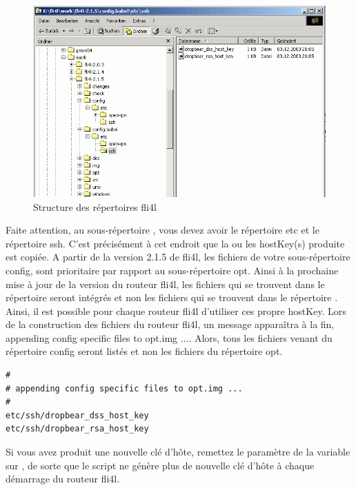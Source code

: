 \begin{description}
  \begin{figure}[htbp]
    \centering
    \includegraphics[width=\columnwidth]{etc_ssh_dir}
    \caption{Structure des répertoires fli4l}
    \label{fig:etc_ssh_dir}
  \end{figure}

  Faite attention, au sous-répertoire , vous devez avoir le
  répertoire etc et le répertoire ssh. C'est précisément à cet endroit que la
  ou les hostKey(s) produite est copiée. A partir de la version 2.1.5 de fli4l,
  les fichiers de votre sous-répertoire config, sont prioritaire par rapport
  au sous-répertoire opt. Ainsi à la prochaine mise à jour de la version du
  routeur fli4l, les fichiers qui se trouvent dans le répertoire 
  seront intégrés et non les fichiers qui se trouvent dans le répertoire
  . Ainsi, il est possible pour chaque routeur fli4l d'utiliser
  ces propre hostKey. Lors de la construction des fichiers du routeur fli4l, un
  message apparaîtra à la fin, \flqq{}appending config specific files to
  opt.img ...\frqq{}. Alors, tous les fichiers venant du répertoire config
  seront listés et non les fichiers du répertoire opt.

\begin{verbatim}
#
# appending config specific files to opt.img ...
#
etc/ssh/dropbear_dss_host_key
etc/ssh/dropbear_rsa_host_key
\end{verbatim}

  Si vous avez produit une nouvelle clé d'hôte, remettez le paramètre de
  la variable  sur , de sorte que le
  script ne génère plus de nouvelle clé d'hôte à chaque démarrage du routeur fli4l.


\end{description}
